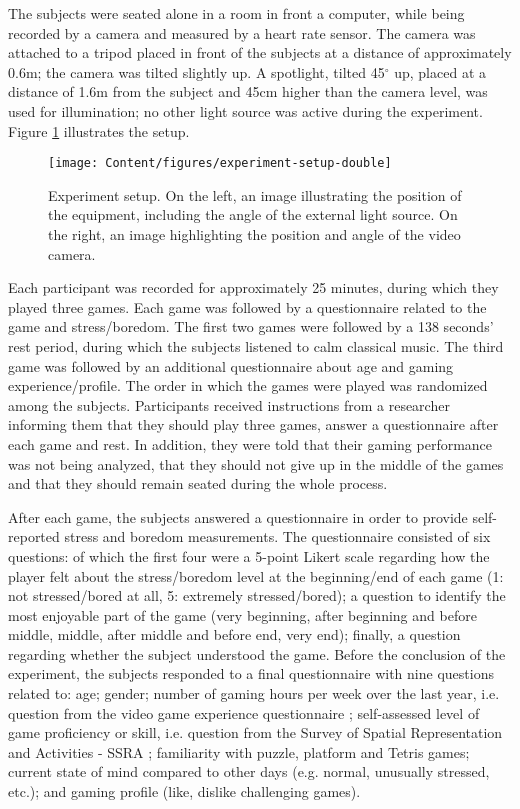 The subjects were seated alone in a room in front a computer, while being recorded by a camera and measured by a heart rate sensor. The camera was attached to a tripod placed in front of the subjects at a distance of approximately 0.6m; the camera was tilted slightly up. A spotlight, tilted 45$^{\circ}$ up, placed at a distance of 1.6m from the subject and 45cm higher than the camera level, was used for illumination; no other light source was active during the experiment. Figure \ref{fig:setup} illustrates the setup.

\begin{figure}[h]
\centering
\texttt{[image: Content/figures/experiment-setup-double]}
\caption{Experiment setup. On the left, an image illustrating the position of the equipment, including the angle of the external light source. On the right, an image highlighting the position and angle of the video camera.}
\label{fig:setup}
\end{figure}

Each participant was recorded for approximately 25 minutes, during which they played three games. Each game was followed by a questionnaire related to the game and stress/boredom. The first two games were followed by a 138 seconds' rest period, during which the subjects listened to calm classical music. The third game was followed by an additional questionnaire about age and gaming experience/profile. The order in which the games were played was randomized among the subjects. Participants received instructions from a researcher informing them that they should play three games, answer a questionnaire after each game and rest. In addition, they were told that their gaming performance was not being analyzed, that they should not give up in the middle of the games and that they should remain seated during the whole process.

After each game, the subjects answered a questionnaire in order to provide self-reported stress and boredom measurements. The questionnaire consisted of six questions: of which the first four were a 5-point Likert scale regarding how the player felt about the stress/boredom level at the beginning/end of each game (1: not stressed/bored at all, 5: extremely stressed/bored); a question to identify the most enjoyable part of the game (very beginning, after beginning and before middle, middle, after middle and before end, very end); finally, a question regarding whether the subject understood the game. Before the conclusion of the experiment, the subjects responded to a final questionnaire with nine questions related to: age; gender; number of gaming hours per week over the last year, i.e. question from the video game experience questionnaire \parencite{unsworth2015playing}; self-assessed level of game proficiency or skill, i.e. question from the Survey of Spatial Representation and Activities - SSRA \parencite{terlecki2005important}; familiarity with puzzle, platform and Tetris games; current state of mind compared to other days (e.g. normal, unusually stressed, etc.); and gaming profile (like, dislike challenging games).


